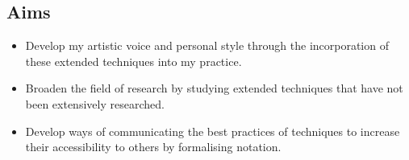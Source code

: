

\subsection{Aims}
\begin{itemize}
   \item Develop my artistic voice and personal style through the incorporation of these extended techniques into my practice.
   \item Broaden the field of research by studying extended techniques that have not been extensively researched.
   \item Develop ways of communicating the best practices of techniques to increase their accessibility to others by formalising notation.
\end{itemize}





